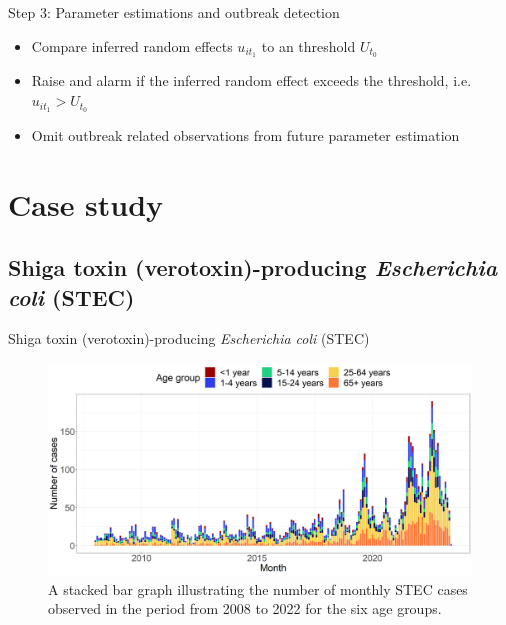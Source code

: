 \documentclass[aspectratio=169]{beamer}
\begin{document}
\begin{frame}{Step 3: Parameter estimations and outbreak detection}
\protect\hypertarget{step-3-parameter-estimations-and-outbreak-detection}{}
\begin{itemize}
  \item Compare inferred random effects $u_{i{t_1}}$ to an threshold $U_{t_0}$
  \item Raise and alarm if the inferred random effect exceeds the threshold, i.e. $u_{i{t_1}}>U_{t_0}$
  \item Omit outbreak related observations from future parameter estimation
\end{itemize}
\end{frame}

\hypertarget{case-study}{%
\section{Case study}\label{case-study}}

\hypertarget{shiga-toxin-verotoxin-producing-escherichia-coli-stec}{%
\subsection{\texorpdfstring{Shiga toxin (verotoxin)-producing
\emph{Escherichia coli}
(STEC)}{Shiga toxin (verotoxin)-producing Escherichia coli (STEC)}}\label{shiga-toxin-verotoxin-producing-escherichia-coli-stec}}

\begin{frame}{Shiga toxin (verotoxin)-producing \emph{Escherichia coli}
(STEC)}
\tiny

\begin{figure}[H]
\includegraphics[width=0.75\linewidth]{../figures/STEC_long_plot} \caption{A stacked bar graph illustrating the number of monthly STEC cases observed in the period from 2008 to 2022 for the six age groups.}\label{fig:STEC}
\end{figure}

\normalsize
\end{frame}
\end{document}
